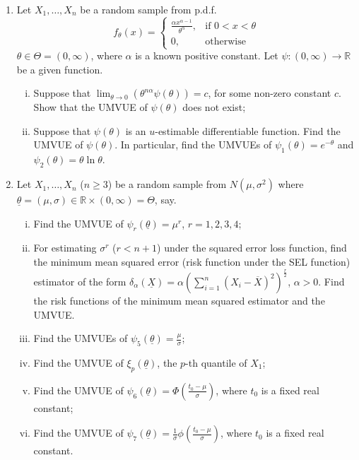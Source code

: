 \documentclass[12pt]{article}
\begin{document}
\begin{enumerate}
    \item Let $X_{1}, \dots, X_{n}$ be a random sample from p.d.f.
    \[ f_{\theta}(x) = \begin{cases} \frac{\alpha x^{\alpha-1}}{\theta^{\alpha}}, & \text{if } 0 < x < \theta \\ 0, & \text{otherwise} \end{cases} \]
    $\theta \in \Theta = (0, \infty)$, where $\alpha$ is a known positive constant. Let $\psi: (0, \infty) \to \mathbb{R}$ be a given function.
    \begin{enumerate}[(i)]
        \item Suppose that $\lim_{\theta \to 0} (\theta^{n\alpha} \psi(\theta)) = c$, for some non-zero constant $c$. Show that the UMVUE of $\psi(\theta)$ does not exist;
        \item Suppose that $\psi(\theta)$ is an $u$-estimable differentiable function. Find the UMVUE of $\psi(\theta)$. In particular, find the UMVUEs of $\psi_{1}(\theta) = e^{-\theta}$ and $\psi_{2}(\theta) = \theta \ln \theta$.
    \end{enumerate}

    \item Let $X_{1}, \dots, X_{n}$ ($n \ge 3$) be a random sample from $N(\mu, \sigma^{2})$ where $\underline{\theta} = (\mu, \sigma) \in \mathbb{R} \times (0, \infty) = \Theta$, say.
    \begin{enumerate}[(i)]
        \item Find the UMVUE of $\psi_{r}(\underline{\theta}) = \mu^{r}$, $r = 1, 2, 3, 4$;
        \item For estimating $\sigma^{r}$ ($r < n+1$) under the squared error loss function, find the minimum mean squared error (risk function under the SEL function) estimator of the form $\delta_{\alpha}(\underline{X}) = \alpha (\sum_{i=1}^{n}(X_{i} - \overline{X})^{2})^{\frac{r}{2}}$, $\alpha > 0$. Find the risk functions of the minimum mean squared estimator and the UMVUE.
        \item Find the UMVUEs of $\psi_{5}(\underline{\theta}) = \frac{\mu}{\sigma}$;
        \item Find the UMVUE of $\xi_{p}(\underline{\theta})$, the $p$-th quantile of $X_{1}$;
        \item Find the UMVUE of $\psi_{6}(\underline{\theta}) = \Phi(\frac{t_{0}-\mu}{\sigma})$, where $t_{0}$ is a fixed real constant;
        \item Find the UMVUE of $\psi_{7}(\underline{\theta}) = \frac{1}{\sigma} \phi(\frac{t_{0}-\mu}{\sigma})$, where $t_{0}$ is a fixed real constant.
    \end{enumerate}


\end{enumerate}
\end{document}
